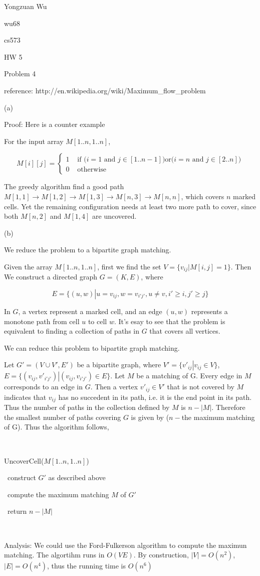 \documentclass[a4paper,12pt]{article}
\begin{document}
Yongzuan Wu

wu68

cs573

HW 5

Problem 4


reference: http://en.wikipedia.org/wiki/Maximum_flow_problem

(a)

Proof: Here is a counter example

For the input array $M[1..n,1..n]$, 

$$
M[i][j] = \left\{ \begin{array}{rl}
  1 &\mbox{ if ($i=1$ and $j\in [1..n-1]$)or($i=n$ and $j\in [2..n]$)} \\
  0 &\mbox{ otherwise}
       \end{array} \right.      
$$ 

The greedy algorithm find a good path $M[1,1]\rightarrow M[1,2] \rightarrow M[1,3] \rightarrow M[n,3] \rightarrow M[n,n]$, which covers $n$ marked cells. Yet the remaining configuration needs at least two more path to cover, since both $M[n,2]$ and $M[1,4]$ are uncovered.

(b)


We reduce the problem to a bipartite graph matching.

Given the array $M[1..n,1..n]$, first we find the set $V=\{v_{ij}\left| M[i,j]=1\}$. Then We construct a directed graph $G=(K,E)$, where 

$$
E=\{(u,w)\left| u=v_{ij}, w=v_{i'j'},  u\neq v, i'\geq i,  j'\geq j\}
$$

In $G$, a vertex represent a marked cell, and an edge $(u,w)$ represents a monotone path from cell $u$ to cell $w$. It's esay to see that the problem is equivalent to finding a collection of paths in $G$ that covers all vertices.

We can reduce this problem to bipartite graph matching.

Let $G'=(V\cup V',E')$ be a bipartite graph, where $V'=\{v'_{ij}\left| v_{ij}\in V\}$,  $E=\{(v_{ij},v'_{i'j'})\left| (v_{ij},v_{i'j'})\in E\}$. Let $M$ be a matching of G. Every edge in $M$ corresponds to an edge in $G$. Then a vertex $v'_{ij} \in V'$ that is not covered by $M$ indicates that $v_{ij}$ has no succedent in its path, i.e. it is the end point in its path. Thus the number of paths in the collection defined by $M$ is $n-\left|M\right|$. Therefore the smallest number of paths covering $G$ is given by ($n-$the maximum matching of G). Thus the algorithm follows,

\

UncoverCell($M[1..n,1..n]$)

\ construct $G'$ as described above

\ compute the maximum matching $M$ of $G'$

\ return  $n-\left|M\right|$

\

Analysis:
We could use the Ford-Fulkerson algorithm to compute the maximun matching. The algortihm runs in $O(VE)$. By construction, $\left|V\right|=O(n^{2})$, $\left|E\right|=O(n^{4})$, thus the running time is $O(n^{6})$
\end{document}
